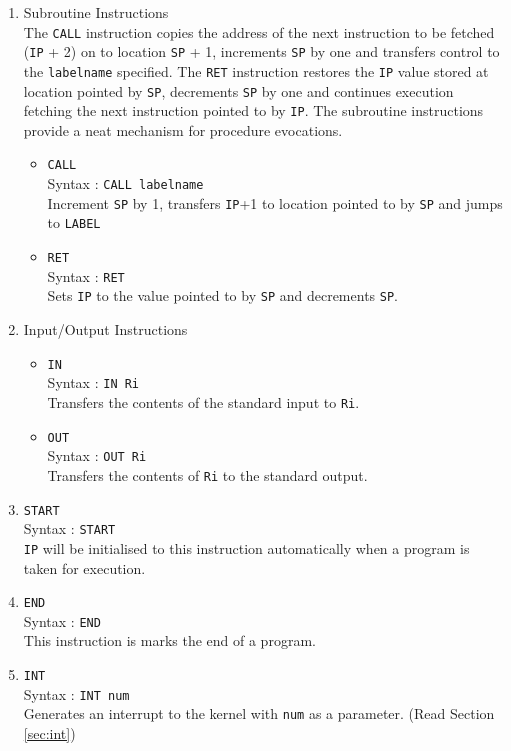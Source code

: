 \documentclass[11pt]{article}
\begin{document}
\begin{enumerate}
\item Subroutine Instructions\\
The \texttt{CALL} instruction copies the address of the next instruction to be fetched (\texttt{IP} + 2) on to location \texttt{SP} + 1, increments \texttt{SP} by one and transfers control to the \texttt{labelname} specified. The \texttt{RET} instruction restores the \texttt{IP} value stored at location pointed by \texttt{SP}, decrements \texttt{SP} by one and continues execution fetching the next instruction pointed to by \texttt{IP}. The subroutine instructions provide a neat mechanism for procedure evocations.
\begin{itemize}
\item \texttt{CALL}\\
Syntax : \texttt{CALL labelname}\\
Increment \texttt{SP} by 1, transfers \texttt{IP}+1 to location pointed to by \texttt{SP} and jumps to \texttt{LABEL}
\item \texttt{RET}\\
Syntax : \texttt{RET}\\
Sets \texttt{IP} to the value pointed to by \texttt{SP} and decrements \texttt{SP}.
\end{itemize}

\item Input/Output Instructions
\begin{itemize}
\item \texttt{IN}\\
Syntax : \texttt{IN Ri}\\
Transfers the contents of the standard input to \texttt{Ri}.
\item \texttt{OUT}\\
Syntax : \texttt{OUT Ri}\\
Transfers the contents of \texttt{Ri} to the standard output.\\
\end{itemize}

\item \texttt{START}\\
Syntax : \texttt{START}\\
\texttt{IP} will be initialised to this instruction automatically when a program is taken for execution.
\item \texttt{END}\\
Syntax : \texttt{END}\\
This instruction is marks the end of a program.
\item \texttt{INT}\\
Syntax : \texttt{INT num}\\
Generates an interrupt to the kernel with \texttt{num} as a parameter. (Read Section \ref{sec:int})
\end{enumerate}
\end{document}
